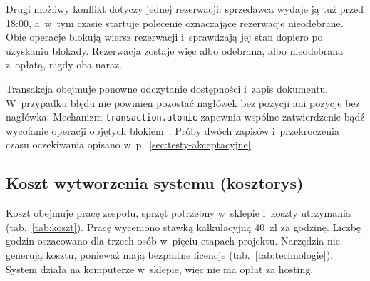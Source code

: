 \documentclass[12pt,a4paper,oneside]{article}
\newcounter{pu}
\begin{document}
Drugi możliwy konflikt dotyczy jednej rezerwacji: sprzedawca wydaje ją tuż przed 18:00, a~w~tym czasie startuje polecenie oznaczające rezerwacje nieodebrane. Obie operacje blokują wiersz rezerwacji i~sprawdzają jej stan dopiero po uzyskaniu blokady. Rezerwacja zostaje więc albo odebrana, albo nieodebrana z~opłatą, nigdy oba naraz.

Transakcja obejmuje ponowne odczytanie dostępności i~zapis dokumentu. W~przypadku błędu nie powinien pozostać nagłówek bez pozycji ani pozycje bez nagłówka. Mechanizm \texttt{transaction.atomic} zapewnia wspólne zatwierdzenie bądź wycofanie operacji objętych blokiem~\cite{django-transakcje}. Próby dwóch zapisów i~przekroczenia czasu oczekiwania opisano w~p.~\ref{sec:testy-akceptacyjne}.

\subsection{Koszt wytworzenia systemu (kosztorys)}
\label{sec:koszt}

Koszt obejmuje pracę zespołu, sprzęt potrzebny w~sklepie i~koszty utrzymania (tab.~\ref{tab:koszt}). Pracę wyceniono stawką kalkulacyjną 40~zł za godzinę. Liczbę godzin oszacowano dla trzech osób w~pięciu etapach projektu. Narzędzia nie generują kosztu, ponieważ mają bezpłatne licencje (tab.~\ref{tab:technologie}). System działa na komputerze w~sklepie, więc nie ma opłat za hosting.
\end{document}
